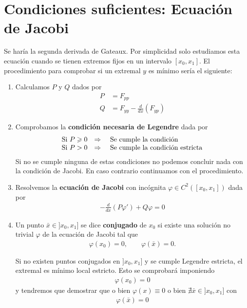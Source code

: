 \documentclass[12pt]{book}
\begin{document}
    \section{Condiciones suficientes: Ecuación de Jacobi}
    Se haría la segunda derivada de Gateaux. Por simplicidad solo estudiamos esta ecuación cuando se tienen extremos fijos en un intervalo $[x_0, x_1]$. El procedimiento para comprobar si un extremal $y$ es mínimo sería el siguiente:
    \begin{enumerate}
        \item Calculamos $P$ y $Q$ dados por 
        \begin{align*}
            P &= F_{pp}\\
            Q &= F_{yy}-\frac{d}{dx}(F_{yp})
        \end{align*}
        \item Comprobamos la \textbf{condición necesaria de Legendre} dada por 
        \begin{gather*}
            \begin{array}{l l l}
                \text{Si } P\geq 0 & \Rightarrow & \text{ Se cumple la condición}\\
                \text{Si } P > 0 & \Rightarrow & \text{ Se cumple la condición estricta}
            \end{array}
        \end{gather*}
        Si no se cumple ninguna de estas condiciones no podemos concluir nada con la condición de Jacobi.
        En caso contrario continuamos con el procedimiento.
        \item Resolvemos la \textbf{ecuación de Jacobi} con incógnita $\varphi \in C^2([x_0, x_1])$ dada por
        \begin{gather*}
            -\frac{d}{dx}(P\varphi') + Q\varphi = 0
        \end{gather*}

        \item 
        
        \begin{definicion}
            Un punto $\bar x\in ]x_0,x_1]$ se dice \textbf{conjugado} de $x_0$ si existe una solución no trivial
            $\varphi$ de la ecuación de Jacobi tal que
            \begin{gather*}
                \varphi(x_0)=0,\qquad \varphi(\bar x)=0.
            \end{gather*}
            \endsquare
        \end{definicion}

        Si no existen puntos conjugados en $]x_0,x_1]$ y se cumple Legendre estricta, el extremal es mínimo local estricto. Esto se comprobará imponiendo
        \begin{gather*}
            \varphi(x_0) = 0
        \end{gather*}
        y tendremos que demostrar que o bien $\varphi(x)\equiv 0$ o bien $\nexists \bar{x}\in]x_0, x_1]$ con
        \begin{gather*}
            \varphi(\bar{x})=0
        \end{gather*}
    \end{enumerate} 
\end{document}
